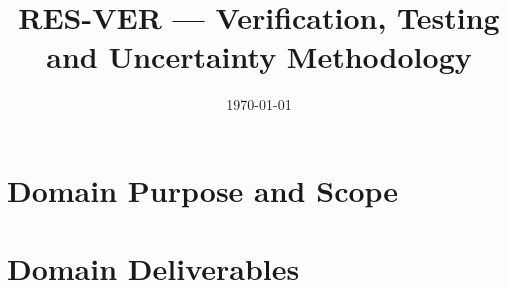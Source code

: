 \documentclass[12pt,a4paper]{article}
\title{RES-VER --- Verification, Testing and Uncertainty Methodology}
\author{}
\date{\today}
\begin{document}
\maketitle

\tableofcontents
\clearpage

\section{Domain Purpose and Scope}
\label{sec:res-ver-domain-purpose}


\section{Domain Deliverables}
\label{sec:res-ver-domain-deliverables}









\clearpage
\printbibliography[
  heading=bibintoc,
  title={References}
]
\end{document}
